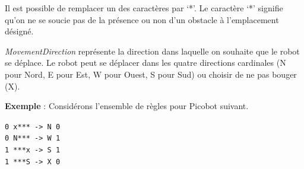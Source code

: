 \documentclass{article}
\begin{document}
\begin{figure}[H]
\end{figure}

Il est possible de remplacer un des caractères par ‘*’. Le caractère ‘*’ signifie qu’on ne se soucie pas de la présence ou non d’un obstacle à l’emplacement désigné.
\vspace{5mm}

\textit{MovementDirection} représente la direction dans laquelle on souhaite que le robot se déplace. Le robot peut se déplacer dans les quatre directions cardinales (N pour Nord, E pour Est, W pour Ouest, S pour Sud) ou choisir de ne pas bouger (X).
\newline

\textbf{Exemple} : Considérons l’ensemble de règles pour Picobot suivant.
\begin{center}
\texttt{0 x*** -> N 0\\
0 N*** -> W 1\\
1 ***x -> S 1\\
1 ***S -> X 0}
\end{center}
\end{document}
